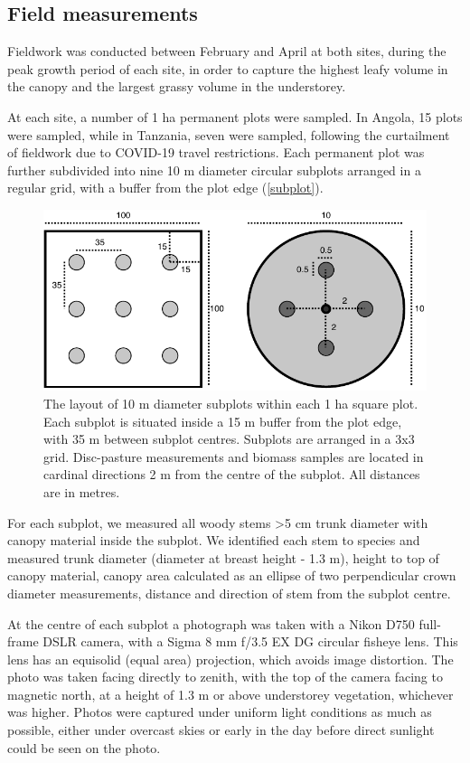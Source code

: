 \documentclass[11pt,a4paper]{article}
\begin{document}
\subsection{Field measurements}

Fieldwork was conducted between February and April at both sites, during the peak growth period of each site, in order to capture the highest leafy volume in the canopy and the largest grassy volume in the understorey.

At each site, a number of 1 ha permanent plots were sampled. In Angola, 15 plots were sampled, while in Tanzania, seven were sampled, following the curtailment of fieldwork due to COVID-19 travel restrictions. Each permanent plot was further subdivided into nine 10 m diameter circular subplots arranged in a regular grid, with a buffer from the plot edge (\autoref{subplot}).

\begin{figure}[H]
\centering
	\includegraphics[width=\textwidth]{subplot}
	\caption{The layout of 10 m diameter subplots within each 1 ha square plot. Each subplot is situated inside a 15 m buffer from the plot edge, with 35 m between subplot centres. Subplots are arranged in a 3x3 grid. Disc-pasture measurements and biomass samples are located in cardinal directions 2 m from the centre of the subplot. All distances are in metres.}
	\label{subplot}
\end{figure}

For each subplot, we measured all woody stems >5 cm trunk diameter with canopy material inside the subplot. We identified each stem to species and measured trunk diameter (diameter at breast height - 1.3 m), height to top of canopy material, canopy area calculated as an ellipse of two perpendicular crown diameter measurements, distance and direction of stem from the subplot centre.

At the centre of each subplot a photograph was taken with a Nikon D750 full-frame DSLR camera, with a Sigma 8 mm f/3.5 EX DG circular fisheye lens. This lens has an equisolid (equal area) projection, which avoids image distortion. The photo was taken facing directly to zenith, with the top of the camera facing to magnetic north, at a height of 1.3 m or above understorey vegetation, whichever was higher. Photos were captured under uniform light conditions as much as possible, either under overcast skies or early in the day before direct sunlight could be seen on the photo. 
\end{document}
